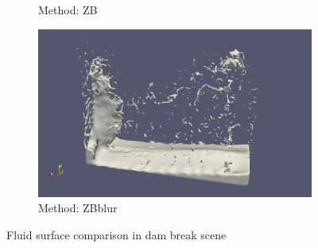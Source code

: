\begin{figure}[h]
\begin{center}
\begin{subfigure}[b]{0.4\textwidth}
				\caption{Method: ZB}
        \end{subfigure}
        \begin{subfigure}[b]{0.4\textwidth}
               \includegraphics[width=\textwidth]{figures/ReconstructionZhuBridsonBlur.png}
				\caption{Method: ZBblur}
        \end{subfigure}
        \caption{Fluid surface comparison in dam break scene}
        \label{fig:DamBreak}
	\end{center}
\end{figure}


